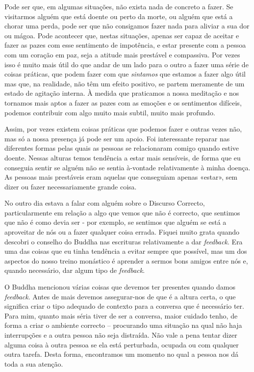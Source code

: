Pode ser que, em algumas situações, não exista nada de concreto a fazer.
Se visitarmos alguém que está doente ou perto da morte, ou alguém que
está a chorar uma perda, pode ser que não consigamos fazer nada para
aliviar a sua dor ou mágoa. Pode acontecer que, nestas situações, apenas
ser capaz de aceitar e fazer as pazes com esse sentimento de impotência,
e estar presente com a pessoa com um coração em paz, seja a atitude mais
prestável e compassiva. Por vezes isso é muito mais útil do que andar de
um lado para o outro a fazer uma série de coisas práticas, que podem
fazer com que \emph{sintamos} que estamos a fazer algo útil mas que, na
realidade, não têm um efeito positivo, se partem meramente de um estado
de agitação interna. À medida que praticamos a nossa meditação e nos
tornamos mais aptos a fazer as pazes com as emoções e os sentimentos
difíceis, podemos contribuir com algo muito mais subtil, muito mais
profundo.

Assim, por vezes existem coisas práticas que podemos fazer e outras
vezes não, mas só a nossa presença já pode ser um apoio. Foi
interessante reparar nas diferentes formas pelas quais as pessoas se
relacionaram comigo quando estive doente. Nessas alturas temos tendência
a estar mais sensíveis, de forma que eu conseguia sentir se alguém não
se sentia à-vontade relativamente à minha doença. As pessoas mais
prestáveis eram aquelas que conseguiam apenas «estar», sem dizer ou
fazer necessariamente grande coisa.

No outro dia estava a falar com alguém sobre o Discurso Correcto,
particularmente em relação a algo que vemos que não é correcto, que
sentimos que não é como devia ser - por exemplo, se sentimos que alguém
se está a aproveitar de nós ou a fazer qualquer coisa errada. Fiquei
muito grata quando descobri o conselho do Buddha nas escrituras
relativamente a dar \emph{feedback}. Era uma das coisas que eu tinha
tendência a evitar sempre que possível, mas um dos aspectos do nosso
treino monástico é aprender a sermos bons amigos entre nós e, quando
necessário, dar algum tipo de \emph{feedback}.

O Buddha mencionou várias coisas que devemos ter presentes quando damos
\emph{feedback}. Antes de mais devemos assegurar-nos de que é a altura
certa, o que significa criar o tipo adequado de contexto para a conversa
que é necessário ter. Para mim, quanto mais séria tiver de ser a
conversa, maior cuidado tenho, de forma a criar o ambiente correcto --
procurando uma situação na qual não haja interrupções e a outra pessoa
não seja distraída. Não vale a pena tentar dizer alguma coisa à outra
pessoa se ela está perturbada, ocupada ou com qualquer outra tarefa.
Desta forma, encontramos um momento no qual a pessoa nos dá toda a sua
atenção.

